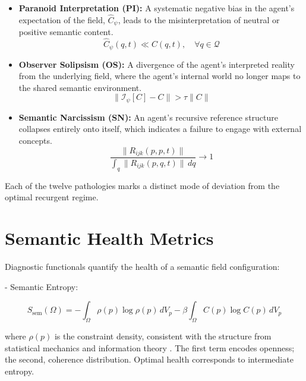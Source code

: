 \begin{itemize}
    \item \textbf{Paranoid Interpretation (PI):} A systematic negative bias in the agent's expectation of the field, \(\hat{C}_{\psi}\), leads to the misinterpretation of neutral or positive semantic content.
    \begin{equation}
    \hat{C}_{\psi}(q,t) \ll C(q,t), \quad \forall q \in \mathcal{Q}
    \end{equation}

    \item \textbf{Observer Solipsism (OS):} A divergence of the agent's interpreted reality from the underlying field, where the agent's internal world no longer maps to the shared semantic environment.
    \begin{equation}
    \|\mathcal{I}_{\psi}[C] - C\| > \tau \|C\|
    \end{equation}

    \item \textbf{Semantic Narcissism (SN):} An agent's recursive reference structure collapses entirely onto itself, which indicates a failure to engage with external concepts.
    \begin{equation}
    \frac{\|R_{ijk}(p,p,t)\|}{\int_q \|R_{ijk}(p,q,t)\| \, dq} \to 1
    \end{equation}
\end{itemize}

Each of the twelve pathologies marks a distinct mode of deviation from the optimal recurgent regime.

\section{Semantic Health Metrics}

Diagnostic functionals quantify the health of a semantic field configuration:

- Semantic Entropy:

\begin{equation}
S_{\text{sem}}(\Omega) = -\int_{\Omega} \rho(p) \log\rho(p) \, dV_p - \beta \int_{\Omega} C(p) \log C(p) \, dV_p
\end{equation}

where $\rho(p)$ is the constraint density, consistent with the structure from statistical mechanics and information theory \autocite{Shannon1948, CoverThomas2006, Reif1965, PathriaBeale2011}. The first term encodes openness; the second, coherence distribution. Optimal health corresponds to intermediate entropy.


